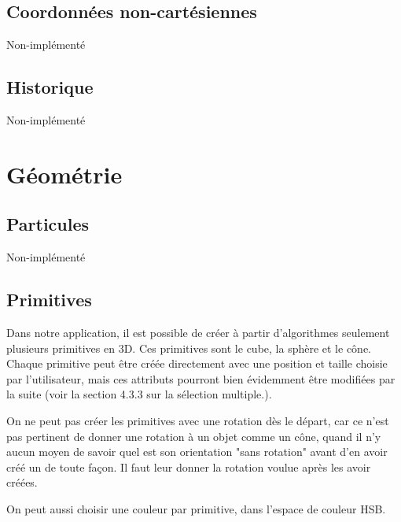 \subsection{Coordonnées non-cartésiennes}
Non-implémenté

\subsection{Historique}
Non-implémenté

\pagebreak
\section{Géométrie}
\subsection{Particules}
Non-implémenté

\newpage

\subsection{Primitives}

Dans notre application, il est possible de créer à partir d'algorithmes seulement plusieurs primitives en 3D. Ces primitives sont le cube, la sphère et le cône. Chaque primitive peut être créée directement avec une position et taille choisie par l'utilisateur, mais ces attributs pourront bien évidemment être modifiées par la suite (voir la section 4.3.3 sur la sélection multiple.).

On ne peut pas créer les primitives avec une rotation dès le départ, car ce n'est pas pertinent de donner une rotation à un objet comme un cône, quand il n'y aucun moyen de savoir quel est son orientation "sans rotation" avant d'en avoir créé un de toute façon. Il faut leur donner la rotation voulue après les avoir créées.

On peut aussi choisir une couleur par primitive, dans l'espace de couleur HSB.

